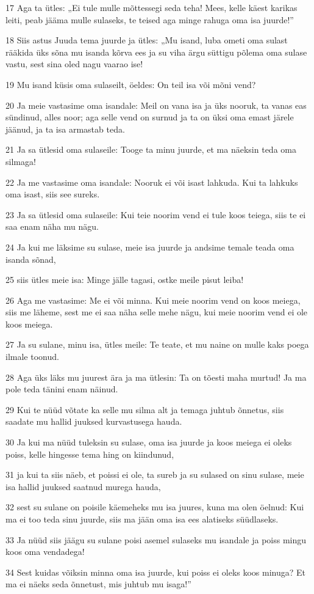 \par 17 Aga ta ütles: „Ei tule mulle mõttessegi seda teha! Mees, kelle käest karikas leiti, peab jääma mulle sulaseks, te teised aga minge rahuga oma isa juurde!”
\par 18 Siis astus Juuda tema juurde ja ütles: „Mu isand, luba ometi oma sulast rääkida üks sõna mu isanda kõrva ees ja su viha ärgu süttigu põlema oma sulase vastu, sest sina oled nagu vaarao ise!
\par 19 Mu isand küsis oma sulaseilt, öeldes: On teil isa või mõni vend?
\par 20 Ja meie vastasime oma isandale: Meil on vana isa ja üks nooruk, ta vanas eas sündinud, alles noor; aga selle vend on surnud ja ta on üksi oma emast järele jäänud, ja ta isa armastab teda.
\par 21 Ja sa ütlesid oma sulaseile: Tooge ta minu juurde, et ma näeksin teda oma silmaga!
\par 22 Ja me vastasime oma isandale: Nooruk ei või isast lahkuda. Kui ta lahkuks oma isast, siis see sureks.
\par 23 Ja sa ütlesid oma sulaseile: Kui teie noorim vend ei tule koos teiega, siis te ei saa enam näha mu nägu.
\par 24 Ja kui me läksime su sulase, meie isa juurde ja andsime temale teada oma isanda sõnad,
\par 25 siis ütles meie isa: Minge jälle tagasi, ostke meile pisut leiba!
\par 26 Aga me vastasime: Me ei või minna. Kui meie noorim vend on koos meiega, siis me läheme, sest me ei saa näha selle mehe nägu, kui meie noorim vend ei ole koos meiega.
\par 27 Ja su sulane, minu isa, ütles meile: Te teate, et mu naine on mulle kaks poega ilmale toonud.
\par 28 Aga üks läks mu juurest ära ja ma ütlesin: Ta on tõesti maha murtud! Ja ma pole teda tänini enam näinud.
\par 29 Kui te nüüd võtate ka selle mu silma alt ja temaga juhtub õnnetus, siis saadate mu hallid juuksed kurvastusega hauda.
\par 30 Ja kui ma nüüd tuleksin su sulase, oma isa juurde ja koos meiega ei oleks poiss, kelle hingesse tema hing on kiindunud,
\par 31 ja kui ta siis näeb, et poissi ei ole, ta sureb ja su sulased on sinu sulase, meie isa hallid juuksed saatnud murega hauda,
\par 32 sest su sulane on poisile käemeheks mu isa juures, kuna ma olen öelnud: Kui ma ei too teda sinu juurde, siis ma jään oma isa ees alatiseks süüdlaseks.
\par 33 Ja nüüd siis jäägu su sulane poisi asemel sulaseks mu isandale ja poiss mingu koos oma vendadega!
\par 34 Sest kuidas võiksin minna oma isa juurde, kui poiss ei oleks koos minuga? Et ma ei näeks seda õnnetust, mis juhtub mu isaga!”

